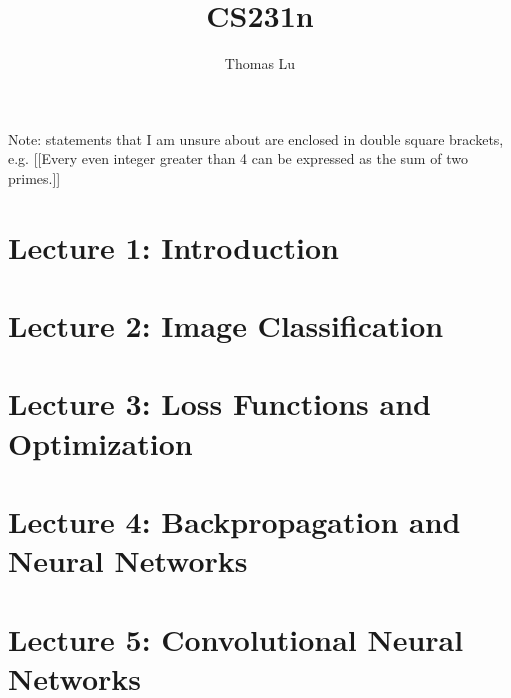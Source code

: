 \documentclass{article}
\title{CS231n}
\author{Thomas Lu}
\date{}
\begin{document}
\maketitle
Note: statements that I am unsure about are enclosed in double square brackets, e.g. [[Every even integer greater than 4 can be expressed as the sum of two primes.]]
\section{Lecture 1: Introduction}

\section{Lecture 2: Image Classification}

\section{Lecture 3: Loss Functions and Optimization}

\section{Lecture 4: Backpropagation and Neural Networks}

\section{Lecture 5: Convolutional Neural Networks}

\end{document}
